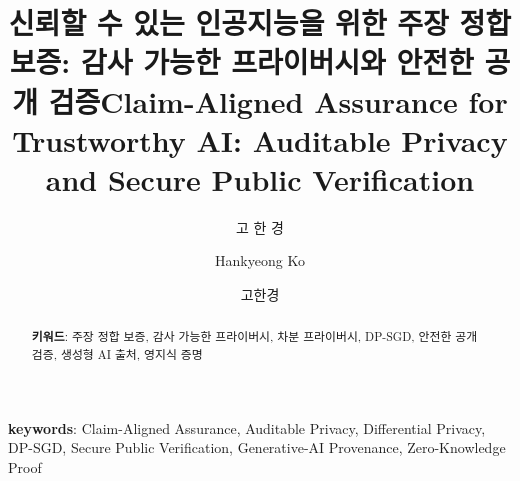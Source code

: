 \documentclass[doctor,korean]{sgmeta_report}
\title[korean]{신뢰할 수 있는 인공지능을 위한 주장 정합 보증: 감사 가능한 프라이버시와 안전한 공개 검증}
\title[english]{Claim-Aligned Assurance for Trustworthy AI: Auditable Privacy and Secure Public Verification}
\author[korean]{고 한 경}
\author[english]{Hankyeong Ko}
\author[nospace]{고한경}
\begin{document}
\renewcommand{\baselinestretch}{1.5}
\selectfont 


\newpage
\makelists

\begin{abstract}
    \par
    

    \vfill
    \noindent
    \begin{minipage}[t][20mm][b]{\textwidth}
        \raggedright
        {\bfseries 키워드}: 주장 정합 보증, 감사 가능한 프라이버시, 차분 프라이버시,
        DP-SGD, 안전한 공개 검증, 생성형 AI 출처, 영지식 증명\par
    \end{minipage}
\end{abstract}









\begin{summary}
    \par
    

    \vfill
    \noindent
    \begin{minipage}[t][20mm][b]{\textwidth}
        {\bfseries keywords}: Claim-Aligned Assurance, Auditable Privacy,
        Differential Privacy, DP-SGD, Secure Public Verification,
        Generative-AI Provenance, Zero-Knowledge Proof\par
    \end{minipage}
\end{summary}
\end{document}
